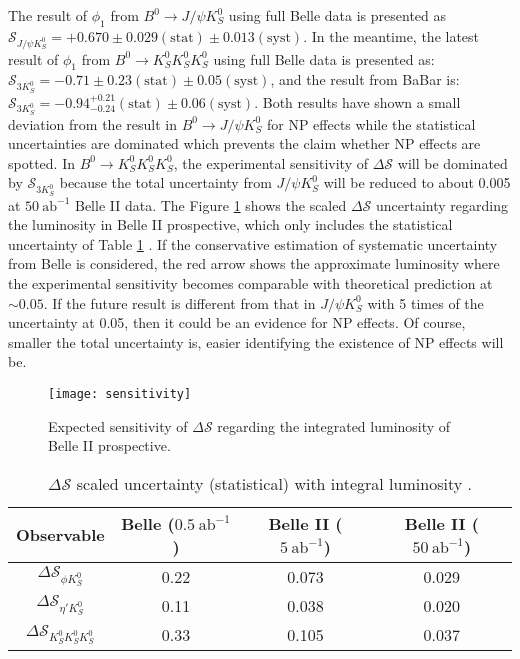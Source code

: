 The result of $\phi_1$ from $B^0 \to J/\psi K_S^0$ using full Belle data is presented as $\mathcal{S}_{J/\psi K^0_S} = + 0.670 \pm 0.029 (\text{stat}) \pm 0.013(\text{syst})$\cite{b2book}. In the meantime, the latest result of  $\phi_1$ from $B^0 \to K_S^0  K_S^0  K_S^0$ using full Belle data\cite{kang2020measurement} is presented as: $\mathcal{S}_{3K^0_S} = - 0.71 \pm 0.23 (\text{stat}) \pm 0.05(\text{syst})$, and the result from BaBar \cite{Lees:2011nf} is: $\mathcal{S}_{ 3K^0_S} = - 0.94 ^{+0.21}_{-0.24} (\text{stat}) \pm 0.06(\text{syst})$. Both results have shown a small deviation from the result in $B^0 \to J/\psi K_S^0$ for NP effects while the statistical uncertainties are dominated which prevents the claim whether NP effects are spotted. In $B^0 \to K_S^0  K_S^0  K_S^0$, the experimental sensitivity of $\Delta \mathcal{S}$ will be dominated by $\mathcal{S}_{3K^0_S}$ because the total uncertainty from $J/\psi K^0_S$ will be reduced to about 0.005 at $50 \: \text{ab}^{-1}$ Belle II data\cite{b2book}. The Figure \ref{fig:sensitivity} shows the scaled $\Delta \mathcal{S}$ uncertainty regarding the luminosity in Belle II prospective\cite{Abe:2010gxa}, which only includes the statistical uncertainty of Table \ref{tab:sensitivity} . If the conservative estimation of systematic uncertainty from Belle is considered, the red arrow shows the approximate luminosity where the experimental sensitivity becomes comparable with theoretical prediction at $\sim 0.05$. If the future result is different from that in $J/\psi K^0_S$ with 5 times of the uncertainty at 0.05, then it could be an evidence for NP effects. Of course, smaller the total uncertainty is, easier identifying the existence of NP effects will be.

\begin{figure}[H]
	\centering
	\texttt{[image: sensitivity]}
	\caption{Expected  sensitivity of $\Delta \mathcal{S}$ regarding the integrated luminosity of Belle II prospective.\cite{Abe:2010gxa}}
	\label{fig:sensitivity}
\end{figure}

\begin{table}[H]
	\centering
	\large
	\caption{$\Delta \mathcal{S}$ scaled uncertainty (statistical) with integral luminosity \cite{Abe:2010gxa}.}
	\label{tab:sensitivity}
	\begin{tabular}{c c c c}
		\toprule
		Observable & Belle ($0.5 \: \text{ab}^{-1}$) & Belle II ($5 \: \text{ab}^{-1}$)& Belle II ($50 \: \text{ab}^{-1}$)\\
		\hline
		$\Delta \mathcal{S}_{\phi K^0_S}$ & 0.22 &  0.073 & 0.029\\
		$\Delta \mathcal{S}_{\eta' K^0_S}$   & 0.11 &  0.038 & 0.020\\
		$\Delta \mathcal{S}_{ K^0_S K^0_S K^0_S}$ & 0.33 & 0.105 & 0.037\\
		\bottomrule
	\end{tabular}
\end{table}

